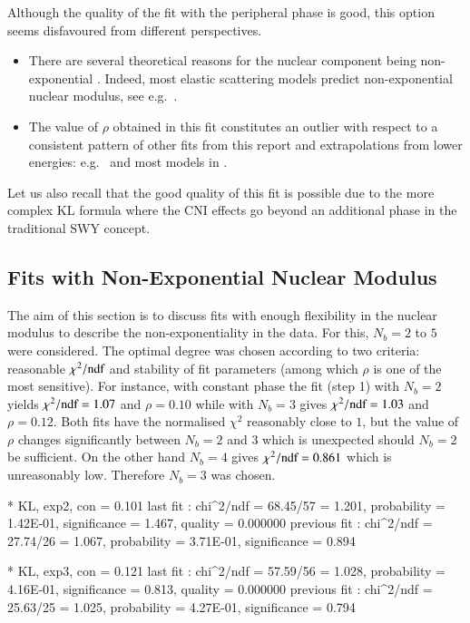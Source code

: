 Although the quality of the fit with the peripheral phase is good, this option seems disfavoured from different perspectives.
\begin{itemize}
\item There are several theoretical reasons for the nuclear component being non-exponential \cite{kmr15-slope} . Indeed, most elastic scattering models predict non-exponential nuclear modulus, see e.g.~\cite{elegent}.
\item The value of $\rho$ obtained in this fit constitutes an outlier with respect to a consistent pattern of other fits from this report and extrapolations from lower energies: e.g.~\cite{fagundes11,block12,compete} and most models in \cite{elegent}.
\end{itemize}
Let us also recall that the good quality of this fit is possible due to the more complex KL formula where the CNI effects go beyond an additional phase in the traditional SWY concept.


\subsection{Fits with Non-Exponential Nuclear Modulus}
\label{sec:fit exp3}

The aim of this section is to discuss fits with enough flexibility in the nuclear modulus to describe the non-exponentiality in the data. For this, $N_b=2$ to $5$ were considered. The optimal degree was chosen according to two criteria: reasonable $\chi^2/\hbox{ndf}$ and stability of fit parameters (among which $\rho$ is one of the most sensitive). For instance, with constant phase the fit (step 1) with $N_b=2$ yields $\chi^2/\hbox{ndf} = 1.07$ and $\rho = 0.10$ while with $N_b=3$ gives $\chi^2/\hbox{ndf} = 1.03$ and $\rho = 0.12$. Both fits have the normalised $\chi^2$ reasonably close to $1$, but the value of $\rho$ changes significantly between $N_b=2$ and $3$ which is unexpected should $N_b=2$ be sufficient. On the other hand $N_b=4$ gives $\chi^2/\hbox{ndf} = 0.861$ which is unreasonably low. Therefore $N_b=3$ was chosen.

\iffalse
* KL, exp2, con
\rh       =   0.101 
last fit     : chi^2/ndf = 68.45/57 = 1.201, probability = 1.42E-01, significance = 1.467, quality = 0.000000
previous fit : chi^2/ndf = 27.74/26 = 1.067, probability = 3.71E-01, significance = 0.894

* KL, exp3, con
\rh       =   0.121 
last fit     : chi^2/ndf = 57.59/56 = 1.028, probability = 4.16E-01, significance = 0.813, quality = 0.000000
previous fit : chi^2/ndf = 25.63/25 = 1.025, probability = 4.27E-01, significance = 0.794

